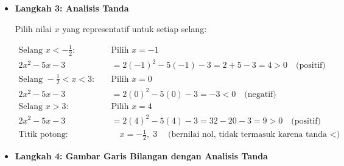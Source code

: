\documentclass[10pt,a4paper]{article}
\newcounter{eqblock}
\newcommand{\reseteq}{%
  \stepcounter{eqblock}%
  \setcounter{equation}{0}%
  \renewcommand{\theHequation}{\arabic{eqblock}.\arabic{equation}}%
}
\begin{document}
\begin{enumerate}
\begin{itemize}
\begin{itemize}
\end{itemize}

\item \textbf{Langkah 3: Analisis Tanda}

Pilih nilai $x$ yang representatif untuk setiap selang:

\reseteq

\begin{align}
\text{Selang } x < -\frac{1}{2}: \quad &\text{Pilih } x = -1 \\
2x^2 - 5x - 3 &= 2(-1)^2 - 5(-1) - 3 = 2 + 5 - 3 = 4 > 0 \quad \text{(positif)} \\
\text{Selang } -\frac{1}{2} < x < 3: \quad &\text{Pilih } x = 0 \\
2x^2 - 5x - 3 &= 2(0)^2 - 5(0) - 3 = -3 < 0 \quad \text{(negatif)} \\
\text{Selang } x > 3: \quad &\text{Pilih } x = 4 \\
2x^2 - 5x - 3 &= 2(4)^2 - 5(4) - 3 = 32 - 20 - 3 = 9 > 0 \quad \text{(positif)} \\
\text{Titik potong:}
  &\quad x = -\tfrac{1}{2},\; 3
  \quad \text{(bernilai nol, tidak termasuk karena tanda $<$)}
\end{align}

\item \textbf{Langkah 4: Gambar Garis Bilangan dengan Analisis Tanda}

\begin{center}
\end{center}
\end{itemize}
\end{enumerate}
\end{document}
